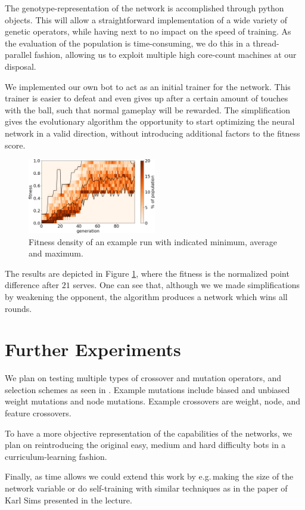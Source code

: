 \documentclass[11pt,a4paper]{scrartcl}
\begin{document}
The genotype-representation of the network is accomplished through python objects. This will allow a straightforward implementation of a wide variety of genetic operators, while having next to no impact on the speed of training.
As the evaluation of the population is time-consuming, we do this in a thread-parallel fashion, allowing us to exploit multiple high core-count machines at our disposal.

We implemented our own bot to act as an initial trainer for the network. This trainer is easier to defeat and even gives up after a certain amount of touches with the ball, such that normal gameplay will be rewarded.
The simplification gives the evolutionary algorithm the opportunity to start optimizing the neural network in a valid direction, without introducing additional factors to the fitness score.

\begin{figure}[H]
\center
\includegraphics[width=0.5\textwidth]{img/fitness.png}
\caption{Fitness density of an example run with indicated minimum, average and maximum.}
\label{fig:train}
\end{figure}

The results are depicted in Figure \ref{fig:train}, where the fitness is the normalized point difference after $21$ serves.
One can see that, although we we made simplifications by weakening the opponent, the algorithm produces a network which wins all rounds.

\section*{Further Experiments}

We plan on testing multiple types of crossover and mutation operators, and selection schemes as seen in \cite{montana1989training}. Example mutations include biased and unbiased weight mutations and node mutations. Example crossovers are weight, node, and feature crossovers.

To have a more objective representation of the capabilities of the networks, we plan on reintroducing the original easy, medium and hard difficulty bots in a curriculum-learning fashion.

Finally, as time allows we could extend this work by e.g.\,making the size of the network variable or do self-training with similar techniques as in the paper of Karl Sims\cite{sims1994evolving} presented in the lecture.

{}

\end{document}
